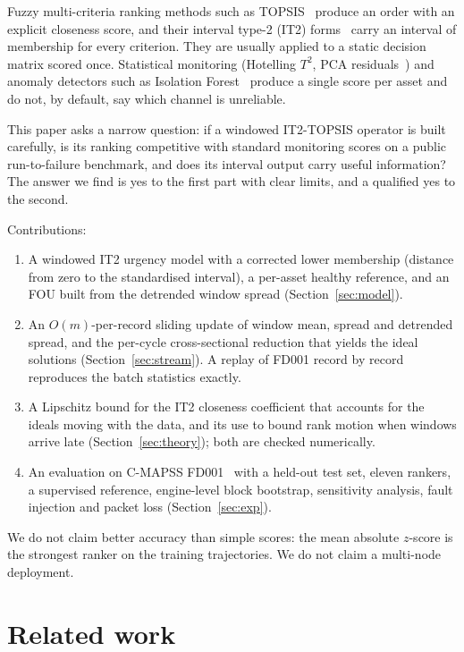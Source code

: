 \documentclass[journal,10pt,twocolumn]{IEEEtran}
\begin{document}
Fuzzy multi-criteria ranking methods such as TOPSIS~\cite{hwang1981,chen2000} produce an order with an explicit closeness score, and their interval type-2 (IT2) forms~\cite{chen2010it2,celik2015} carry an interval of membership for every criterion. They are usually applied to a static decision matrix scored once. Statistical monitoring (Hotelling $T^2$, PCA residuals~\cite{macgregor1995}) and anomaly detectors such as Isolation Forest~\cite{liu2008iforest} produce a single score per asset and do not, by default, say which channel is unreliable.

This paper asks a narrow question: if a windowed IT2-TOPSIS operator is built carefully, is its ranking competitive with standard monitoring scores on a public run-to-failure benchmark, and does its interval output carry useful information? The answer we find is yes to the first part with clear limits, and a qualified yes to the second.

Contributions:
\begin{enumerate}
\item A windowed IT2 urgency model with a corrected lower membership (distance from zero to the standardised interval), a per-asset healthy reference, and an FOU built from the detrended window spread (Section~\ref{sec:model}).
\item An $O(m)$-per-record sliding update of window mean, spread and detrended spread, and the per-cycle cross-sectional reduction that yields the ideal solutions (Section~\ref{sec:stream}). A replay of FD001 record by record reproduces the batch statistics exactly.
\item A Lipschitz bound for the IT2 closeness coefficient that accounts for the ideals moving with the data, and its use to bound rank motion when windows arrive late (Section~\ref{sec:theory}); both are checked numerically.
\item An evaluation on C-MAPSS FD001~\cite{saxena2008} with a held-out test set, eleven rankers, a supervised reference, engine-level block bootstrap, sensitivity analysis, fault injection and packet loss (Section~\ref{sec:exp}).
\end{enumerate}
We do not claim better accuracy than simple scores: the mean absolute $z$-score is the strongest ranker on the training trajectories. We do not claim a multi-node deployment.

\section{Related work}
\end{document}
